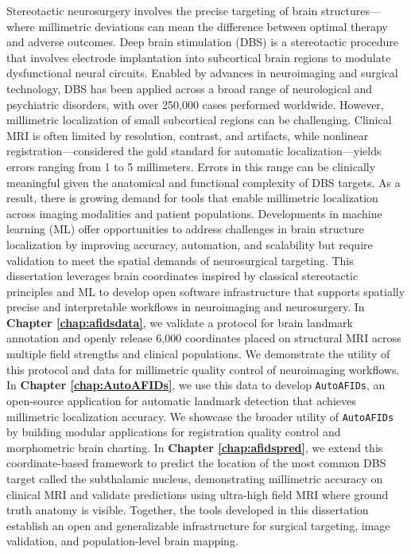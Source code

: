 \onehalfspacing

Stereotactic neurosurgery involves the precise targeting of brain structures—where millimetric deviations can mean the difference between optimal therapy and adverse outcomes. Deep brain stimulation (DBS) is a stereotactic procedure that involves electrode implantation into subcortical brain regions to modulate dysfunctional neural circuits. Enabled by advances in neuroimaging and surgical technology, DBS has been applied across a broad range of neurological and psychiatric disorders, with over 250,000 cases performed worldwide. However, millimetric localization of small subcortical regions can be challenging. Clinical MRI is often limited by resolution, contrast, and artifacts, while nonlinear registration—considered the gold standard for automatic localization—yields errors ranging from 1 to 5 millimeters. Errors in this range can be clinically meaningful given the anatomical and functional complexity of DBS targets. As a result, there is growing demand for tools that enable millimetric localization across imaging modalities and patient populations. Developments in machine learning (ML) offer opportunities to address challenges in brain structure localization by improving accuracy, automation, and scalability but require validation to meet the spatial demands of neurosurgical targeting. This dissertation leverages brain coordinates inspired by classical stereotactic principles and ML to develop open software infrastructure that supports spatially precise and interpretable workflows in neuroimaging and neurosurgery. In \textbf{Chapter \ref{chap:afidsdata}}, we validate a protocol for brain landmark annotation and openly release 6,000 coordinates placed on structural MRI across multiple field strengths and clinical populations. We demonstrate the utility of this protocol and data for millimetric quality control of neuroimaging workflows. In \textbf{Chapter \ref{chap:AutoAFIDs}}, we use this data to develop \texttt{AutoAFIDs}, an open-source application for automatic landmark detection that achieves millimetric localization accuracy. We showcase the broader utility of \texttt{AutoAFIDs} by building modular applications for registration quality control and morphometric brain charting. In \textbf{Chapter \ref{chap:afidspred}}, we extend this coordinate-based framework to predict the location of the most common DBS target called the subthalamic nucleus, demonstrating millimetric accuracy on clinical MRI and validate predictions using ultra-high field MRI where ground truth anatomy is visible. Together, the tools developed in this dissertation establish an open and generalizable infrastructure for surgical targeting, image validation, and population-level brain mapping.
